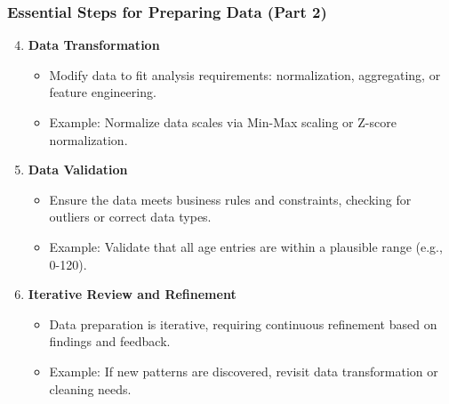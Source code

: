 \documentclass[aspectratio=169]{beamer}
\begin{document}
\begin{frame}[fragile]
    \frametitle{Essential Steps for Preparing Data (Part 2)}
    \begin{enumerate}
        \setcounter{enumi}{3}  %
        \item \textbf{Data Transformation}
            \begin{itemize}
                \item Modify data to fit analysis requirements: normalization, aggregating, or feature engineering.
                \item Example: Normalize data scales via Min-Max scaling or Z-score normalization.
            \end{itemize}
        
        \item \textbf{Data Validation}
            \begin{itemize}
                \item Ensure the data meets business rules and constraints, checking for outliers or correct data types.
                \item Example: Validate that all age entries are within a plausible range (e.g., 0-120).
            \end{itemize} 

        \item \textbf{Iterative Review and Refinement}
            \begin{itemize}
                \item Data preparation is iterative, requiring continuous refinement based on findings and feedback.
                \item Example: If new patterns are discovered, revisit data transformation or cleaning needs.
            \end{itemize}
    \end{enumerate}
\end{frame}
\end{document}
